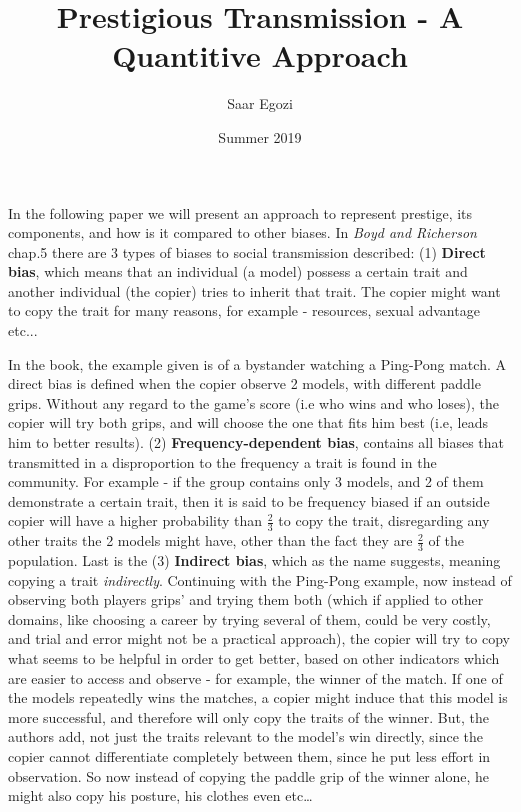 \documentclass[11pt]{article}
\title{Prestigious Transmission - A Quantitive Approach}
\author{Saar Egozi}
\date{Summer 2019}
\begin{document}
\maketitle
 
 In the following paper we will present an approach to represent prestige, its components, and how is it compared to other biases.
 In \textit{Boyd and Richerson} \cite{evolutionBook} chap.5 there are 3 types of biases to social transmission described: (1) \textbf{Direct bias}, which means that an individual (a model) possess a certain trait and another individual (the copier) tries to inherit that trait. The copier might want to copy the trait for many reasons, for example - resources, sexual advantage etc... 
 
 In the book, the example given is of a bystander watching a Ping-Pong match. A direct bias is defined when the copier observe 2 models, with different paddle grips. Without any regard to the game's score (i.e who wins and who loses), the copier will try both grips, and will choose the one that fits him best (i.e, leads him to better results). (2) \textbf{Frequency-dependent bias}, contains all biases
 that transmitted in a disproportion to the frequency a trait is found in the community. For example - if the group contains only 3 models, and 2 of them demonstrate a certain trait, then it is said to be frequency biased if
 an outside copier will have a higher probability than $\frac{2}{3}$ to copy the trait, disregarding any other traits the 2 models might have, other than the fact they are $\frac{2}{3}$ of the population. 
 Last is the (3) \textbf{Indirect bias}, which as the name suggests, meaning copying a trait \textit{indirectly}. Continuing with the Ping-Pong example, now instead of observing both players grips' and trying them both (which if applied to other domains, like choosing a career by trying several of them, could be very costly, and trial and error might not be a practical approach), the copier will try to copy what seems to be helpful in order to get better, based on other indicators which are easier to access and observe - for example, the winner of the match. If one of the models repeatedly wins the matches, a copier might induce that this model is more successful, and therefore will only copy the traits of the winner. But, the authors add, not just the traits relevant to the model's win directly, since the copier cannot differentiate completely between them, since he put less effort in observation. So now instead of copying the paddle grip of the winner alone, he might also copy his posture, his clothes even etc\dots
 
\end{document}
